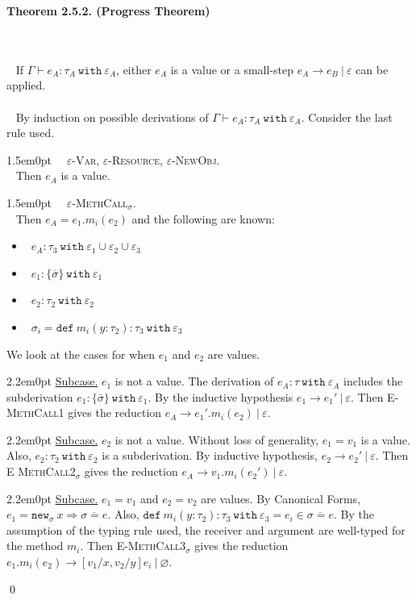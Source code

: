 \documentclass{llncs}
\newcommand{\keywadj}[1]{\mathtt{#1}}
\newcommand{\keyw}[1]{\keywadj{#1}~}
\newcommand{\thm}[3]{
	\begin{large}
		\bf{#1}
	\end{large} \\\\
	\fbox{Statement.} ~ #2
	\fbox{Proof.}~ #3 \qed
}
\newcommand{\proofcase}[2]{
	\begin{adjustwidth}{1.5em}{0pt}
		\fbox{Case.}~~#1. \\ ~#2
	\end{adjustwidth}
}
\newcommand{\subcase}[1] {
	\begin{adjustwidth}{2.2em}{0pt}
		\underline{Subcase.} #1
	\end{adjustwidth}
}
\begin{document}
\thm{Theorem 2.5.2. (Progress Theorem)}
{If $\Gamma \vdash e_A : \tau_A~\keyw{with} \varepsilon_A$, either $e_A$ is a value or a small-step $e_A \longrightarrow e_B~|~\varepsilon$ can be applied. \\\\}
{By induction on possible derivations of $\Gamma \vdash e_A : \tau_A~\keyw{with} \varepsilon_A$. Consider the last rule used. \\

	\proofcase{\textsc{$\varepsilon$-Var}, \textsc{$\varepsilon$-Resource}, \textsc{$\varepsilon$-NewObj}} {
		Then $e_A$ is a value. \\
	}
		
	\proofcase{\textsc{$\varepsilon$-MethCall$_\sigma$}} {
		Then $e_A = e_1.m_i(e_2)$ and the following are known:
		\begin{itemize}
			\item~$e_A : \tau_3~\keyw{with} \varepsilon_1 \cup \varepsilon_2 \cup \varepsilon_3$
			\item~$e_1  : \{ \overline \sigma \}~ \keyw{with} \varepsilon_1$
			\item~$e_2 : \tau_2~\keyw{with} \varepsilon_2$
			\item~$\sigma_i = \keyw{def} m_i(y : \tau_2) : \tau_3~ \keyw{with} \varepsilon_3$
		\end{itemize}
		We look at the cases for when $e_1$ and $e_2$ are values.
		
			\subcase{ $e_1$ is not a value. The derivation of $e_A : \tau~\keyw{with} \varepsilon_A$ includes the subderivation $e_1 : \{ \bar \sigma \}~\keyw{with} \varepsilon_1$. By the inductive hypothesis $e_1 \longrightarrow e_1'~|~\varepsilon$. Then \textsc{E-MethCall1} gives the reduction $e_A \longrightarrow e_1'.m_i(e_2)~|~\varepsilon$. }
	
			\subcase{ $e_2$ is not a value. Without loss of generality, $e_1 = v_1$ is a value. Also,
		$e_2 : \tau_2~\keyw{with} \varepsilon_2$ is a subderivation. By inductive hypothesis, $e_2 \longrightarrow e_2'~|~\varepsilon$. Then \textsc{E
		MethCall2$_{\sigma}$} gives the reduction $e_A \longrightarrow
		v_1.m_i(e_2')~|~\varepsilon$.}
		
			\subcase{ $e_1 = v_1$ and $e_2 = v_2$ are values. By Canonical Forms, $e_1 = \keywadj{new}_{\sigma}~x \Rightarrow \overline{\sigma = e}$. Also, $\keyw{def} m_i(y: \tau_2) : \tau_3~\keyw{with} \varepsilon_3 = e_i \in \overline{ \sigma = e }$. By the assumption of the typing rule used, the receiver and argument are well-typed for the method $m_i$. Then \textsc{E-MethCall3$_{\sigma}$} gives the reduction $e_1.m_i(e_2) \longrightarrow [v_1/x, v_2/y]e_i~|~\varnothing$.\\}

}}
\end{document}

